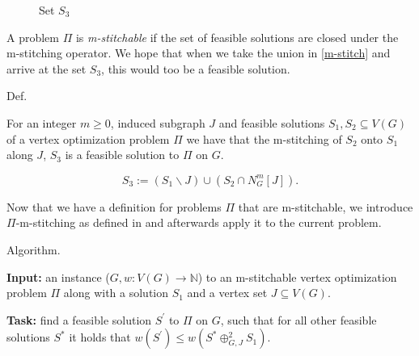 \begin{figure}[H]
\begin{minipage}{0.49\textwidth}
        \caption{Set $S_3$}
        \label{fig:stitched_set}
    \end{minipage}
\end{figure}

\noindent A problem $\Pi$ is \textit{m-stitchable} if the set of feasible solutions are closed 
under the m-stitching operator. We hope that when we take the union in \ref{m-stitch} and arrive 
at the set $S_3$, this would too be a feasible solution.

\begin{mydefinition}[m-stitchable]{Def.}
    \label{m-stitchable}

    For an integer $m \geq 0$, induced subgraph $J$ and feasible solutions $S_1, S_2 \subseteq V(G)$ 
    of a vertex optimization problem $\Pi$ we have that the m-stitching of $S_2$ onto $S_1$ along 
    $J$, $S_3$ is a feasible solution to $\Pi$ on $G$.

    \[S_3 := (S_1 \backslash J) \cup (S_2 \cap N^{m}_{G} \left[J\right]).\]

\end{mydefinition}

\noindent Now that we have a definition for problems $\Pi$ that are m-stitchable, we introduce 
$\Pi$-m-stitching as defined in \cite{bumpus_et_al:LIPIcs.SWAT.2024.19} and afterwards apply 
it to the current problem.

\begin{mydefinition}[$\Pi$-m-stitching]{Algorithm.}
    \label{alg:p-m-stitching}

    \textbf{Input:}
    an instance ($G, w : V(G) \to \mathbb{N}$) to an m-stitchable vertex optimization problem $\Pi$ 
    along with a solution $S_1$ and a vertex set $J \subseteq V(G)$.

    \textbf{Task:}
    find a feasible solution $S^{\prime}$ to $\Pi$ on $G$, such that for all other feasible solutions 
    $S^*$ it holds that $w(S^{\prime}) \leq w\left(S^{*} \oplus^{2}_{G,J} S_1\right)$.

\end{mydefinition}

